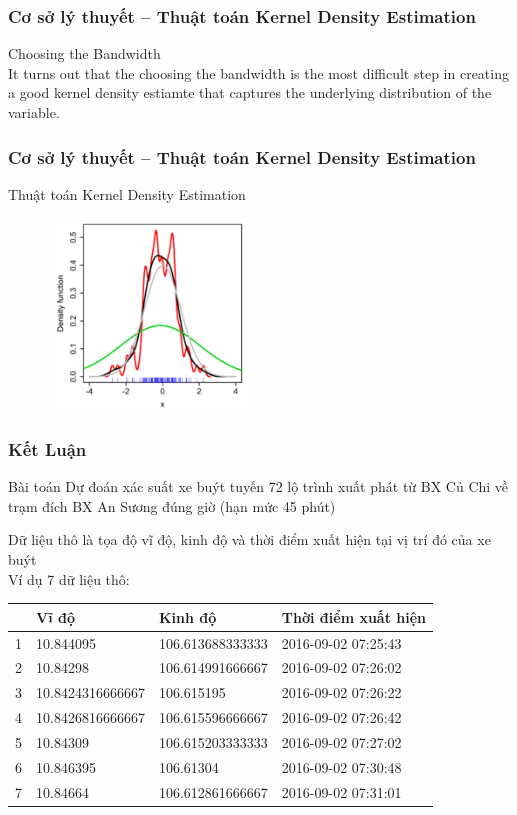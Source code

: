 \documentclass[t]{beamer}
\begin{document}
\begin{frame}
\frametitle{Cơ sở lý thuyết -- Thuật toán Kernel Density Estimation}
Choosing the Bandwidth\\
It turns out that the choosing the bandwidth is the most difficult step in creating a good kernel density estiamte that captures the underlying distribution of the variable.\\
\end{frame}


\begin{frame}
\frametitle{Cơ sở lý thuyết -- Thuật toán Kernel Density Estimation}
Thuật toán Kernel Density Estimation
\begin{center}
\includegraphics[height=2in,width=3in]{220px-Comparison_of_1D_bandwidth_selectors.png}
\end{center}
\end{frame}


\begin{frame}
\frametitle{Kết Luận}
\begin{block}{Bài toán}
Dự đoán xác suất xe buýt tuyến 72 lộ trình xuất phát từ BX Củ Chi về trạm đích BX An Sương đúng giờ (hạn mức 45 phút)
\end{block}
Dữ liệu thô là tọa độ vĩ độ, kinh độ và thời điểm xuất hiện tại vị trí đó của xe buýt\\
Ví dụ 7 dữ liệu thô:\\
\begin{flushleft}
\begin{tabular}{ |l|l|l|l| }
\hline
&Vĩ độ & Kinh độ & Thời điểm xuất hiện \\ 
\hline
1&10.844095 & 106.613688333333 & 2016-09-02 07:25:43 \\ 
\hline
2&10.84298 & 106.614991666667 & 2016-09-02 07:26:02 \\
\hline
3&10.8424316666667 & 106.615195 & 2016-09-02 07:26:22 \\
\hline
4&10.8426816666667 & 106.615596666667 & 2016-09-02 07:26:42 \\
\hline
5&10.84309 & 106.615203333333 & 2016-09-02 07:27:02 \\
\hline
6&10.846395 & 106.61304 & 2016-09-02 07:30:48 \\
\hline
7&10.84664 & 106.612861666667 & 2016-09-02 07:31:01 \\
\hline 
\end{tabular}
\end{flushleft}
\end{frame}
\end{document}
